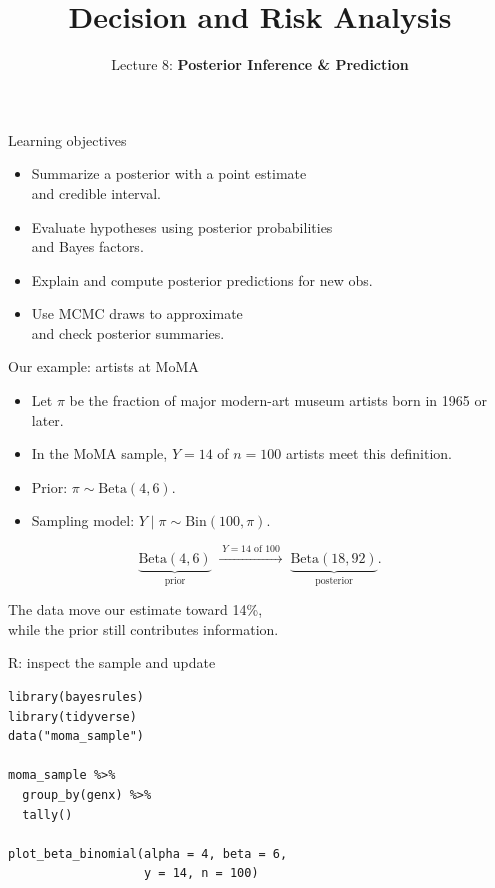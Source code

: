 \documentclass[aspectratio=43]{beamer}
\title{Decision and Risk Analysis}
\subtitle{Lecture 8: \textbf{Posterior Inference \& Prediction}}
\author{}
\date{\color{aggiemaroon}{DAEN 427 / ISEN 427 / ISEN 627 - Fall 2026\\
      \textbf{Alexander Abuabara}}}
\begin{document}
\begin{frame}\titlepage\end{frame}

\begin{frame}{Learning objectives}
\begin{itemize}
\item Summarize a posterior with a point estimate\\and credible interval.
\item Evaluate hypotheses using posterior probabilities\\and Bayes factors.
\item Explain and compute posterior predictions for new obs.
\item Use MCMC draws to approximate\\and check posterior summaries.
\end{itemize}
\end{frame}

\begin{frame}{Our example: artists at MoMA}
\begin{itemize}
\item Let $\pi$ be the fraction of major modern-art museum artists born in 1965 or later.
\item In the MoMA sample, $Y=14$ of $n=100$ artists meet this definition.
\item Prior: $\pi\sim\mathrm{Beta}(4,6)$.
\item Sampling model: $Y\mid\pi\sim\mathrm{Bin}(100,\pi)$.
\end{itemize}
\[
\underbrace{\mathrm{Beta}(4,6)}_{\text{prior}}
\;\xrightarrow{\;Y=14\text{ of }100\;}\;
\underbrace{\mathrm{Beta}(18,92)}_{\text{posterior}}.
\]
\begin{block}{}
The data move our estimate toward 14\%,\\while the prior still contributes information.
\end{block}
\end{frame}

\begin{frame}[fragile]{R: inspect the sample and update}
\begin{lstlisting}
library(bayesrules)
library(tidyverse)
data("moma_sample")

moma_sample %>%
  group_by(genx) %>%
  tally()

plot_beta_binomial(alpha = 4, beta = 6,
                   y = 14, n = 100)
\end{lstlisting}
\end{frame}
\end{document}
